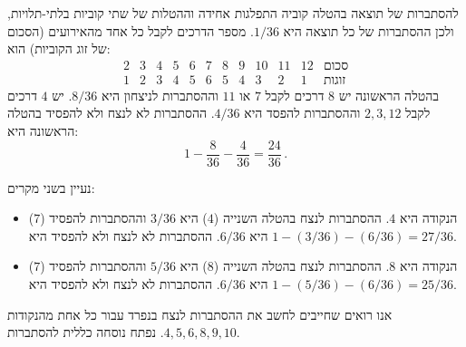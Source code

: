 

להסתברות של תוצאה בהטלה קוביה התפלגות אחידה וההטלות של שתי קוביות בלתי-תלויות, ולכן ההסתברות של כל תוצאה היא 
$1/36$.
מספר הדרכים לקבל כל אחד מהאירועים (הסכום של זוג הקוביות) הוא:
\[
\begin{array}{rrrrrrrrrrr|l}
2 & 3 & 4 & 5 & 6 & 7 & 8 & 9 & 10 & 11 & 12&\textrm{סכום}\\\hline
 1 & 2 & 3 & 4 & 5 & 6 & 5 & 4 & 3 & 2 & 1&\textrm{זוגות}
\end{array}
\]
בהטלה הראשונה יש 
$8$
דרכים לקבל
$7$
או
$11$
וההסתברות לניצחון היא
$8/36$.
יש
$4$
דרכים לקבל
$2,3,12$
וההסתברות להפסד היא 
$4/36$.
ההסתברות לא לנצח ולא להפסיד בהטלה הראשונה היא:
\[
1 - \frac{8}{36} - \frac{4}{36} = \frac{24}{36}\,.
\]


נעיין בשני מקרים:
\begin{itemize}
\item 
הנקודה היא
$4$.
ההסתברות לנצח בהטלה השנייה ($4$) היא
$3/36$
וההסתברות להפסיד ($7$) היא
$6/36$.
ההסתברות לא לנצח ולא להפסיד היא
$1-(3/36)-(6/36)=27/36$.

\item
הנקודה היא $8$. ההסתברות לנצח בהטלה השנייה ($8$) היא
$5/36$
וההסתברות להפסיד ($7$) היא
$6/36$.
ההסתברות לא לנצח ולא להפסיד היא
$1-(5/36)-(6/36)=25/36$.
\end{itemize}
אנו רואים שחייבים לחשב את ההסתברות לנצח בנפרד עבור כל אחת מהנקודות 
$4,5,6,8,9,10$.
נפתח נוסחה כללית להסתברות.

